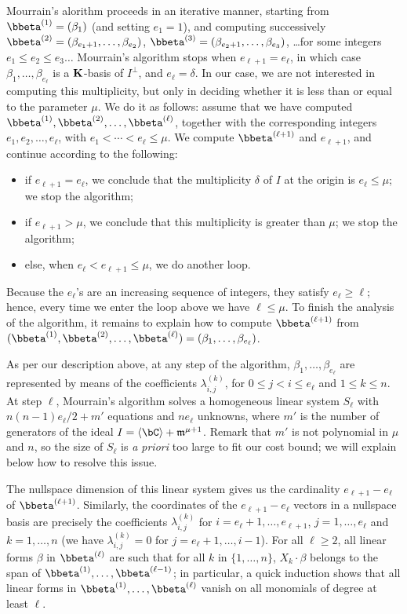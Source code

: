 \documentclass[12pt]{article}
\begin{document}
Mourrain's alorithm proceeds in an iterative manner, starting from
$\bbeta^{(1)}=(\beta_{1})$ (and setting $e_1=1$), and computing
successively $\bbeta^{(2)}=(\beta_{e_1+1},\dots,\beta_{e_2})$,
$\bbeta^{(3)}=(\beta_{e_2+1},\dots,\beta_{e_3})$, \dots for some
integers $e_1 \le e_2 \le e_3 \dots$ Mourrain's algorithm stops when
$e_{\ell+1}=e_{\ell}$, in which case $\beta_1,\dots,\beta_{e_\ell}$ is
a $\mathbf{K}$-basis of $I^\perp$, and $e_\ell=\delta$. In our case, we
are not interested in computing this multiplicity, but only in
deciding whether it is less than or equal to the parameter $\mu$. We do it as follows: assume that we have
computed $\bbeta^{(1)},\bbeta^{(2)},\dots,\bbeta^{(\ell)}$, together
with the corresponding integers $e_1,e_2,\dots,e_\ell$, with $e_1 <
\cdots < e_\ell \le \mu$. We compute $\bbeta^{(\ell+1)}$ and $e_{\ell+1}$,
and continue according to the following:
\begin{itemize}
\item if $e_{\ell+1}=e_{\ell}$, we conclude that the multiplicity
  $\delta$ of $I$ at the origin is $e_\ell \le \mu$; we stop the
  algorithm;
\item if $e_{\ell+1} > \mu$, we conclude that this multiplicity is greater 
  than $\mu$; we stop the algorithm;
\item else, when $e_\ell < e_{\ell+1} \le \mu$, we do another loop.
\end{itemize}
Because the $e_\ell$'s are an increasing sequence of integers, they
satisfy $e_\ell \ge \ell$; hence, every time we enter the loop above we
have $\ell \le \mu$. To finish the analysis of the algorithm, it
remains to explain how to compute $\bbeta^{(\ell+1)}$ from
$(\bbeta^{(1)},\bbeta^{(2)},\dots,\bbeta^{(\ell)})=(\beta_{1},\dots,\beta_{e_\ell})$.

As per our description above, at any step of the algorithm,
$\beta_{1},\dots,\beta_{e_\ell}$ are represented by means of the
coefficients $\lambda^{(k)}_{i,j}$, for $0 \le j < i \le e_{\ell}$ and
$1 \le k \le n$.  At step $\ell$, Mourrain's algorithm solves a homogeneous linear system
$S_\ell$ with $n(n-1) e_\ell/2+m'$ equations and $n e_\ell$ unknowns,
where $m'$ is the number of generators of the ideal $I= \langle \bC
\rangle + \m^{\mu+1}$. Remark that $m'$ is not polynomial in $\mu$ 
and $n$, so the size of $S_\ell$ is {\em a priori} too large to 
fit our cost bound; we will explain below how to resolve this issue.

The nullspace dimension of this linear system gives us the cardinality
$e_{\ell+1}-e_{\ell}$ of $\bbeta^{(\ell+1)}$. Similarly, the coordinates of
the $e_{\ell+1}-e_{\ell}$ vectors in a nullspace basis are precisely
the coefficients $\lambda^{(k)}_{i,j}$ for
$i=e_{\ell}+1,\dots,e_{\ell+1}$, $j=1,\dots,e_\ell$ and $k=1,\dots,n$
(we have $\lambda^{(k)}_{i,j}=0$ for $j=e_{\ell}+1,\dots,i-1$). For
all $\ell \ge 2$, all linear forms $\beta$ in $\bbeta^{(\ell)}$ are
such that for all $k$ in $\{1,\dots,n\}$, $X_k \cdot \beta$ belongs to
the span of $\bbeta^{(1)},\dots,\bbeta^{(\ell-1)}$; in particular, a
quick induction shows that all linear forms in
$\bbeta^{(1)},\dots,\bbeta^{(\ell)}$ vanish on all monomials of degree
at least $\ell$.
\end{document}

